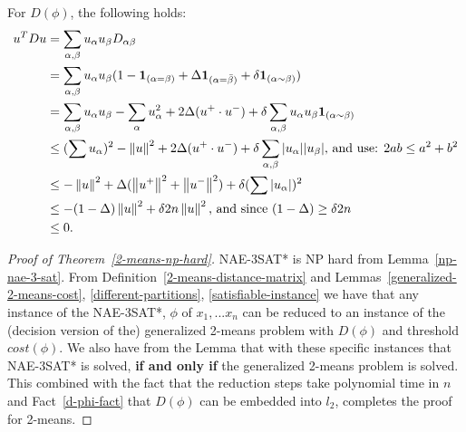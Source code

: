 \begin{fact} \label{d-phi-fact}
For $D(\phi)$, the following holds:
\begin{align*}
u^TDu &= \sum_{\alpha, \beta} u_\alpha u_\beta D_{\alpha \beta}\\ 
&=\sum_{\alpha, \beta} u_\alpha u_\beta (1 - \mathbf{1}_{(\alpha =
  \beta)} + \Delta\mathbf{1}_{(\alpha = \bar{\beta})} + \delta
\mathbf{1}_{(\alpha \sim \beta)})\\ 
&=\sum_{\alpha, \beta} u_\alpha u_\beta - \sum_{\alpha} u_\alpha^2
+2\Delta (u^+ \cdot u^-) + \delta \sum_{\alpha, \beta} u_\alpha
u_\beta \mathbf{1}_{(\alpha \sim \beta)}\\ 
& \le (\sum u_\alpha)^2  - \left\lVert u\right\rVert^2 + 2\Delta (u^+ \cdot u^-) +
\delta \sum_{\alpha, \beta} |u_\alpha| |u_\beta| \text{,  and use:
  $2ab \le a^2 + b^2$}\\  
& \le - \left\lVert u\right\rVert^2 + \Delta (\left\lVert u^+\right\rVert^2  + \left\lVert u^-\right\rVert^2) + \delta
(\sum |u_\alpha|)^2 \\ 
& \le -(1- \Delta) \left\lVert u\right\rVert^2  + \delta 2n \left\lVert u\right\rVert^2  \text{,  and
  since $(1- \Delta) \ge \delta 2n$} \\ 
& \le 0.
\end{align*}
\end{fact}


\begin{proof}[Proof of Theorem~\ref{2-means-np-hard}]
NAE-3SAT* is NP hard from Lemma~\ref{np-nae-3-sat}.  From
Definition~\ref{2-means-distance-matrix} and
Lemmas~\ref{generalized-2-means-cost}, \ref{different-partitions},
\ref{satisfiable-instance} we have that any instance of the NAE-3SAT*,
$\phi$ of $x_1,...x_n$ can be reduced to an instance of the (decision
version of the) generalized 2-means problem with $D(\phi)$ and
threshold $cost(\phi)$.  We also have from the Lemma that with these
specific instances that NAE-3SAT* is solved, \textbf{if and only if}
the generalized 2-means problem is solved.  This combined with the
fact that the reduction steps take polynomial time in $n$ and
Fact~\ref{d-phi-fact} that $D(\phi)$ can be embedded into $l_2$,
completes the proof for 2-means. 
\end{proof}
